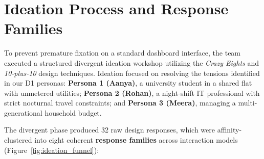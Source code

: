\documentclass[12pt,a4paper]{article}
\begin{document}
\section{Ideation Process and Response Families}

To prevent premature fixation on a standard dashboard interface, the team executed a structured divergent ideation workshop utilizing the \emph{Crazy Eights} and \emph{10-plus-10} design techniques. Ideation focused on resolving the tensions identified in our D1 personas: \textbf{Persona 1 (Aanya)}, a university student in a shared flat with unmetered utilities; \textbf{Persona 2 (Rohan)}, a night-shift IT professional with strict nocturnal travel constraints; and \textbf{Persona 3 (Meera)}, managing a multi-generational household budget.

The divergent phase produced 32 raw design responses, which were affinity-clustered into eight coherent \textbf{response families} across interaction models (Figure~\ref{fig:ideation_funnel}):
\end{document}
